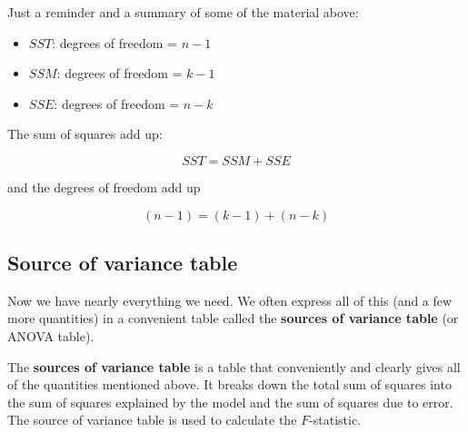 \documentclass[
  letterpaper,
  8pt,
  a4paper]{book}
\providecommand{\tightlist}{%
  \setlength{\itemsep}{0pt}\setlength{\parskip}{0pt}}
\begin{document}
Just a reminder and a summary of some of the material above:

\begin{itemize}
\tightlist
\item
  \(SST\): degrees of freedom = \(n-1\)
\item
  \(SSM\): degrees of freedom = \(k-1\)
\item
  \(SSE\): degrees of freedom = \(n-k\)
\end{itemize}

The sum of squares add up:

\[SST = SSM + SSE\]

and the degrees of freedom add up

\[(n-1) = (k-1) + (n - k)\]

\subsection*{Source of variance table}\label{source-of-variance-table}

Now we have nearly everything we need. We often express all of this (and
a few more quantities) in a convenient table called the \textbf{sources
of variance table} (or ANOVA table).

The \textbf{sources of variance table} is a table that conveniently and
clearly gives all of the quantities mentioned above. It breaks down the
total sum of squares into the sum of squares explained by the model and
the sum of squares due to error. The source of variance table is used to
calculate the \(F\)-statistic.
\end{document}
